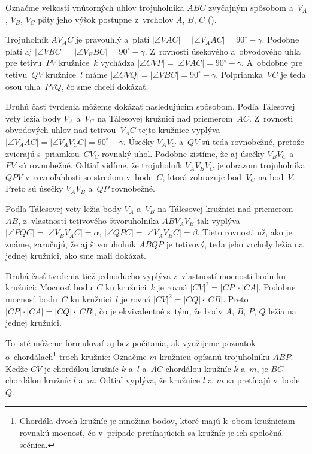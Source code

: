 {%
Označme veľkosti vnútorných uhlov trojuholníka $ABC$ zvyčajným spôsobom
a~$V_A$, $V_B$, $V_C$ päty jeho výšok postupne z~vrcholov $A$, $B$, $C$
(\obr).
%

Trojuholník $AV_AC$ je pravouhlý a~platí $|\angle VAC|=|\angle V_A
AC|=90^\circ-\gamma$. Podobne platí
aj $|\angle VBC|=|\angle V_B BC|= 90^\circ-\gamma$. Z~rovnosti úsekového
a~obvodového uhla pre tetivu~$PV$ kružnice~$k$ vychádza $|\angle CVP|=|\angle
VAC|=90^\circ-\gamma$. A~obdobne
pre tetivu~$QV$ kružnice~$l$ máme $|\angle CVQ|=|\angle VBC|=90^\circ-\gamma$.
Polpriamka~$VC$ je teda osou uhla~$PVQ$, čo sme chceli dokázať.

Druhú časť tvrdenia môžeme dokázať nasledujúcim spôsobom. Podľa Tálesovej
vety ležia body $V_A$ a~$V_C$ na Tálesovej kružnici nad priemerom~$AC$.
Z~rovnosti obvodových uhlov nad tetivou~$V_A C$ tejto kružnice
vyplýva $|\angle V_AAC|=|\angle V_A V_C C|=90^\circ-\gamma$.
Úsečky $V_A V_C$ a~$QV$ sú teda rovnobežné, pretože zvierajú s~priamkou~$C V_C$
rovnaký uhol. Podobne zistíme, že aj úsečky $V_B V_C$ a~$PV$ sú
rovnobežné. Odtiaľ vidíme, že trojuholník $V_A V_B V_C$ je obrazom
trojuholníka $QPV$ v~rovnoľahlosti so stredom v~bode~$C$, ktorá zobrazuje
bod~$V_C$ na bod~$V$. Preto sú úsečky $V_A V_B$ a~$QP$ rovnobežné.

Podľa Tálesovej vety ležia body $V_A$ a~$V_B$ na Tálesovej kružnici nad
priemerom~$AB$, z~vlastností tetivového štvoruholníka $A B V_A V_B$ tak vyplýva
$|\angle PQC|=|\angle V_B V_A C|=\alpha$, $|\angle QPC|=|\angle V_A V_B
C|=\beta$. Tieto rovnosti už, ako je známe, zaručujú, že aj štvoruholník $ABQP$ je
tetivový, teda jeho vrcholy ležia na jednej kružnici, ako sme mali
dokázať.

\poznamka
Druhá časť tvrdenia tiež jednoducho vyplýva z~vlastností mocnosti bodu ku kružnici:
Mocnosť bodu~$C$ ku kružnici~$k$ je
rovná $|CV|^2=|CP|\cdot|CA|$. Podobne mocnosť bodu~$C$ ku kružnici~$l$ je
rovná $|CV|^2=|CQ|\cdot|CB|$.  Preto $|CP|\cdot|CA|=|CQ|\cdot|CB|$, čo je
ekvivalentné s~tým, že body $A$, $B$, $P$, $Q$ ležia na jednej kružnici.

To isté môžeme formulovať aj bez počítania, ak využijeme poznatok
o~chordálach\footnote{Chordála dvoch kružníc je množina bodov, ktoré majú
k~obom kružniciam rovnakú mocnosť, čo v~prípade pretínajúcich sa kružníc
je ich spoločná sečnica.} troch kružníc: Označme $m$ kružnicu opísanú trojuholníku $ABP$.
Keďže $CV$ je chordálou kružníc $k$ a~$l$ a~$AC$ chordálou kružníc $k$ a~$m$,
je $BC$ chordálou kružníc $l$ a~$m$. Odtiaľ vyplýva, že kružnice $l$ a~$m$ sa pretínajú
v~bode~$Q$.



}
